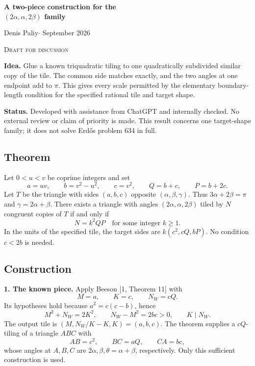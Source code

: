 \documentclass[10pt,a4paper]{article}
\begin{document}
\thispagestyle{plain}
\begin{center}
{\Large\bfseries A two-piece construction for the\\[4pt]
$(2\alpha,\alpha,2\beta)$ family}\par
\medskip Denis Paliy\quad$\cdot$ September 2026\par
\smallskip\small\textsc{Draft for discussion}
\end{center}

\textbf{Idea.} Glue a known triquadratic tiling to one quadratically subdivided
similar copy of the tile. The common side matches exactly, and the two angles
at one endpoint add to $\pi$. This gives every scale permitted by the elementary
boundary-length condition for the specified rational tile and target shape.

\textbf{Status.} Developed with assistance from ChatGPT and internally checked.
No external review or claim of priority is made. This result concerns one target-shape
family; it does not solve Erd\H{o}s problem 634 in full.

\subsection*{Theorem}
Let $0<u<v$ be coprime integers and set
\[
 a=uv,\qquad b=v^2-u^2,\qquad c=v^2,\qquad
 Q=b+c,\qquad P=b+2c.
\]
Let $T$ be the triangle with sides $(a,b,c)$ opposite $(\alpha,\beta,\gamma)$.
Thus $3\alpha+2\beta=\pi$ and $\gamma=2\alpha+\beta$.
There exists a triangle with angles $(2\alpha,\alpha,2\beta)$ tiled by $N$
congruent copies of $T$ if and only if
\[
 \boxed{N=k^2QP\quad\text{for some integer }k\ge1.}
\]
In the units of the specified tile, the target sides are
$k(c^2,cQ,bP)$. No condition $c<2b$ is needed.

\subsection*{Construction}
\textbf{1. The known piece.} Apply Beeson [1, Theorem 11] with
\[
 M=a,\qquad K=c,\qquad N_W=cQ.
\]
Its hypotheses hold because $a^2=c(c-b)$, hence
\[
 M^2+N_W=2K^2,\qquad N_W-M^2=2bc>0,\qquad K\mid N_W.
\]
The output tile is $(M,N_W/K-K,K)=(a,b,c)$. The theorem supplies a
$cQ$-tiling of a triangle $ABC$ with
\[
 AB=c^2,\qquad BC=aQ,\qquad CA=bc,
\]
whose angles at $A,B,C$ are $2\alpha,\beta,\theta=\alpha+\beta$, respectively.
Only this sufficient construction is used.
\end{document}
